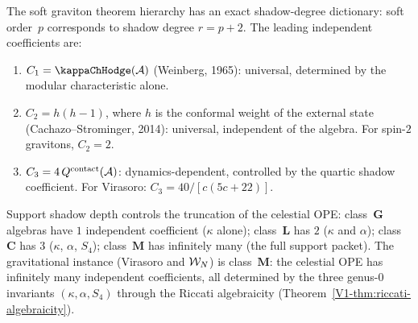 \begin{remark}
\label{rem:celestial-ope-shadow-degree}
The soft graviton theorem hierarchy has an exact
shadow-degree dictionary: soft order~$p$ corresponds to
shadow degree $r = p + 2$. The leading independent
coefficients are:
\begin{enumerate}[label=\textup{(\roman*)}]
\item $C_1 = \kappaChHodge(\cA)$ (Weinberg, 1965):
 universal, determined by the modular characteristic alone.
\item $C_2 = h(h-1)$, where $h$ is the conformal weight
 of the external state
 (Cachazo--Strominger, 2014):
 universal, independent of the algebra.
 For spin-$2$ gravitons, $C_2 = 2$.
\item $C_3 = 4\,Q^{\mathrm{contact}}(\mathcal{A})$:
 dynamics-dependent, controlled by the quartic shadow
 coefficient. For Virasoro:
 $C_3 = 40/[c(5c{+}22)]$.
\end{enumerate}
Support shadow depth controls the truncation of the celestial OPE:
class~$\mathbf{G}$ algebras have $1$ independent coefficient
($\kappa$ alone); class~$\mathbf{L}$ has $2$
($\kappa$ and $\alpha$); class~$\mathbf{C}$ has $3$
($\kappa$, $\alpha$, $S_4$); class~$\mathbf{M}$ has
infinitely many (the full support packet).
The gravitational instance (Virasoro and $\mathcal{W}_N$) is
class~$\mathbf{M}$: the celestial OPE has infinitely
many independent coefficients, all determined by the
three genus-$0$ invariants $(\kappa, \alpha, S_4)$ through
the Riccati algebraicity
(Theorem~\ref*{V1-thm:riccati-algebraicity}).
\end{remark}

